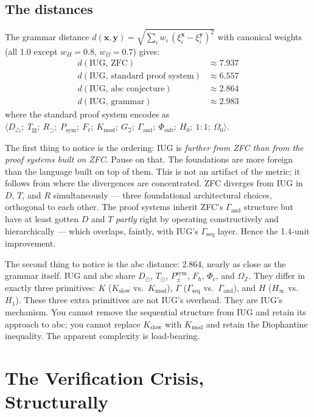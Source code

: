 \documentclass[12pt]{article}
\theoremstyle{plain}
\theoremstyle{definition}
\theoremstyle{remark}
\newcommand{\bZ}{\mathbb{Z}}
\begin{document}
\subsection{The distances}
\label{subsec:distances}

The grammar distance $d(\mathbf{x}, \mathbf{y}) = \sqrt{\sum_i w_i\,(\xi_i^\mathbf{x} - \xi_i^\mathbf{y})^2}$
with canonical weights (all 1.0 except $w_H = 0.8$, $w_\Omega = 0.7$) gives:
\begin{align*}
  d(\text{IUG},\, \text{ZFC}) &\approx 7.937 \\
  d(\text{IUG},\, \text{standard proof system}) &\approx 6.557 \\
  d(\text{IUG},\, \text{abc conjecture}) &\approx 2.864 \\
  d(\text{IUG},\, \text{grammar}) &\approx 2.983
\end{align*}
where the standard proof system encodes as
$\langle D_\triangle;\ T_\boxtimes;\ R_\supset;\ P_\text{sym};\ F_\ell;\ K_\text{mod};\ G_\beth;\ \Gamma_\text{and};\ \Phi_\text{sub};\ H_0;\ 1{:}1;\ \Omega_0 \rangle$.

The first thing to notice is the ordering: IUG is \emph{further from ZFC than from the
proof systems built on ZFC}. Pause on that. The foundations are more foreign than the
language built on top of them. This is not an artifact of the metric; it follows from
where the divergences are concentrated. ZFC diverges from IUG in $D$, $T$, and $R$
simultaneously --- three foundational architectural choices, orthogonal to each other.
The proof systems inherit ZFC's $\Gamma_\text{and}$ structure but have at least gotten $D$
and $T$ \emph{partly} right by operating constructively and hierarchically --- which overlaps,
faintly, with IUG's $\Gamma_\text{seq}$ layer. Hence the 1.4-unit improvement.

The second thing to notice is the abc distance: 2.864, nearly as close as the grammar itself.
IUG and abc share $D_\odot$, $T_\odot$, $P_\pm^\text{sym}$, $F_\hbar$, $\Phi_c$, and $\Omega_\bZ$.
They differ in exactly three primitives: $K$ ($K_\text{slow}$ vs.\ $K_\text{mod}$),
$\Gamma$ ($\Gamma_\text{seq}$ vs.\ $\Gamma_\text{and}$), and $H$ ($H_\infty$ vs.\ $H_1$).
These three extra primitives are not IUG's overhead. They are IUG's mechanism. You cannot
remove the sequential structure from IUG and retain its approach to abc; you cannot replace
$K_\text{slow}$ with $K_\text{mod}$ and retain the Diophantine inequality. The apparent
complexity is load-bearing.

\section{The Verification Crisis, Structurally}
\label{sec:crisis}
\end{document}
